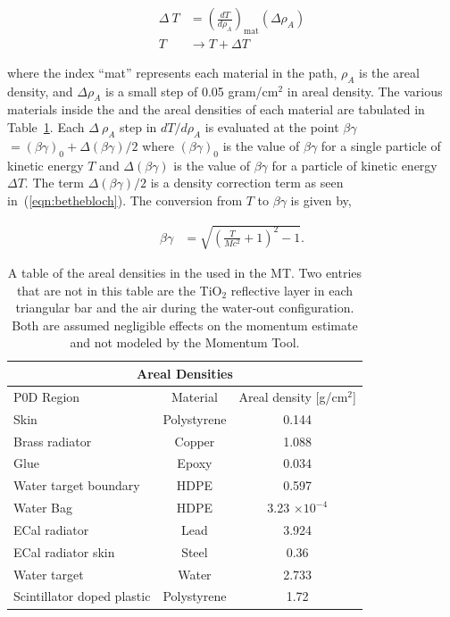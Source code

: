 \begin{align*}
    \Delta~T &= {\left(\frac{dT}{d\rho_{A}}\right)}_\text{mat} {\left(\Delta\rho_{A}\right)}\\
    T &\rightarrow T+\Delta T \,
\end{align*}

\noindent{}where the index ``mat'' represents each material in the path,
$\rho_{A}$ is the areal density, and $\Delta\rho_{A}$ is a
small step of 0.05 gram/cm$^2$ in areal density. The
various materials inside the \podtext{} and the areal densities of each material
are tabulated in Table~\ref{tab:arealdensities}. Each $\Delta~\rho_{A}$ step in $dT/d\rho_{A}$ is
evaluated at the point $\beta\gamma$ $= {(\beta\gamma)}_0 +
\Delta(\beta\gamma)/2$ where ${(\beta\gamma)}_0$ is the value of $\beta\gamma$
for a single particle of kinetic energy $T$ and $\Delta(\beta\gamma)$ is the
value of $\beta\gamma$ for a particle of kinetic energy $\Delta T$.
The term $\Delta(\beta\gamma)/2$ is a density correction term as seen
in~(\ref{eqn:bethebloch}). The conversion from $T$ to $\beta\gamma$ is given by,

\begin{align}\label{eqn:betagammaenergyconversion}
    \beta\gamma &= \sqrt{{\left(\frac{T}{M c^2}+1\right)}^{2}-1}\text{.}
\end{align}

\begin{table}[h!]
    \centering
    \begin{tabular}{lcc}
	\multicolumn{3}{c}{\podtext{} Areal Densities} \\
        \toprule
        P0D Region & Material & Areal density [g/cm$^2$] \\
        \midrule
        \podule{} Skin & Polystyrene & 0.144 \\
        Brass radiator & Copper & 1.088 \\
        Glue & Epoxy & 0.034 \\
        Water target boundary & HDPE & 0.597 \\
        Water Bag & HDPE & 3.23 $\times 10^{-4}$ \\
        ECal radiator & Lead & 3.924 \\
        ECal radiator skin & Steel & 0.36 \\
        Water target & Water & 2.733 \\
        Scintillator doped plastic & Polystyrene & 1.72 \\
        \bottomrule
    \end{tabular}
    \caption[\podtext{} Areal Densities]{A table of the areal densities in the
	\podtext{} used in the MT\@. Two entries that are not in this table
	are the TiO$_2$ reflective layer in each triangular bar and the air
	during the \podtext{} water-out configuration. Both are assumed negligible
	effects on the momentum estimate and not modeled by the Momentum
	Tool.}\label{tab:arealdensities}
\end{table}

